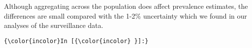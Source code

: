 \documentclass{article}
\begin{document}
Although aggregating across the population does affect prevalence
estimates, the differences are small compared with the 1-2\% uncertainty
which we found in our analyses of the surveillance data.

    \begin{footnotesize}
        \begin{Verbatim}[commandchars=\\\{\}]
{\color{incolor}In [{\color{incolor} }]:} 
\end{Verbatim}
    \end{footnotesize}


    
    
    
    
\end{document}
